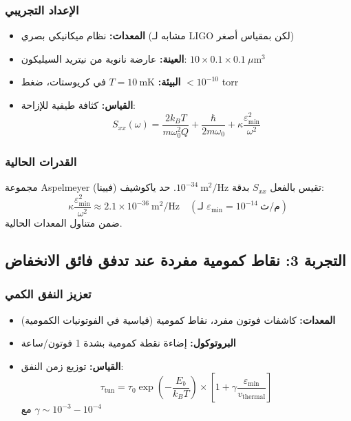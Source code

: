 \documentclass[11pt,a4paper]{article}
\begin{document}
	\subsubsection{الإعداد التجريبي}
	\begin{itemize}
		\item \textbf{المعدات:} نظام ميكانيكي بصري (مشابه لـ LIGO لكن بمقياس أصغر)
		\item \textbf{العينة:} عارضة نانوية من نيتريد السيليكون: $10 \times 0.1 \times 0.1\ \mu\text{m}^3$
		\item \textbf{البيئة:} $T = 10\ \text{mK}$ في كريوستات، ضغط $< 10^{-10}$ torr
		\item \textbf{القياس:} كثافة طيفية للإزاحة:
		\[
		S_{xx}(\omega) = \frac{2k_B T}{m\omega_0^2 Q} + \frac{\hbar}{2m\omega_0} + \kappa\frac{\varepsilon_{\min}^2}{\omega^2}
		\]
	\end{itemize}
	
	\subsubsection{القدرات الحالية}
	
	مجموعة Aspelmeyer (فيينا) تقيس بالفعل $S_{xx}$ بدقة $10^{-34}\ \text{m}^2/\text{Hz}$. حد ياكوشيف:
	\[
	\kappa\frac{\varepsilon_{\min}^2}{\omega^2} \approx 2.1 \times 10^{-36}\ \text{m}^2/\text{Hz} \quad (\text{لـ } \varepsilon_{\min} = 10^{-14}\ \text{م/ث})
	\]
	ضمن متناول المعدات الحالية.
	
	\subsection{التجربة 3: نقاط كمومية مفردة عند تدفق فائق الانخفاض}
	
	\subsubsection{تعزيز النفق الكمي}
	\begin{itemize}
		\item \textbf{المعدات:} كاشفات فوتون مفرد، نقاط كمومية (قياسية في الفوتونيات الكمومية)
		\item \textbf{البروتوكول:} إضاءة نقطة كمومية بشدة 1 فوتون/ساعة
		\item \textbf{القياس:} توزيع زمن النفق:
		\[
		\tau_{\text{tun}} = \tau_0 \exp\left(-\frac{E_b}{k_B T}\right) \times \left[1 + \gamma\frac{\varepsilon_{\min}}{v_{\text{thermal}}}\right]
		\]
		مع $\gamma \sim 10^{-3} - 10^{-4}$
	\end{itemize}
	
\end{document}

